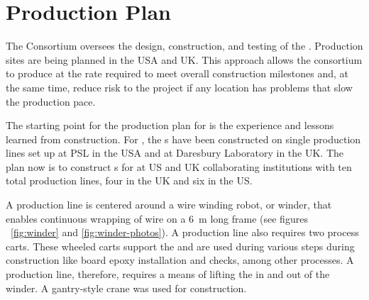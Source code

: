 \section{Production Plan}
\label{sec:fdsp-apa-prod}

The  Consortium oversees the design, construction, and testing of the   . Production sites are being planned in the USA and UK. This approach allows the consortium to produce  at the rate required to meet overall construction milestones and, at the same time, reduce risk to the project if any location has problems that slow the production pace.

The starting point for the  production plan for   is the experience and lessons learned from  construction. For , the s have been constructed on single production lines set up at PSL in the USA and at Daresbury Laboratory in the UK.  The plan now is to construct s for  at US and UK collaborating institutions with ten total production lines, four in the UK and six in the US.  

A production line is centered around a wire winding robot, or winder, that enables continuous wrapping of wire on a \SI{6}{m} long frame (see figures ~\ref{fig:winder} and \ref{fig:winder-photos}). 
A production line also requires two process carts. These wheeled carts support the  and are used during various steps during construction like board epoxy installation and  checks, among other processes. A production line, therefore, requires a means of lifting the  in and out of the winder. A gantry-style crane was used for  construction.

